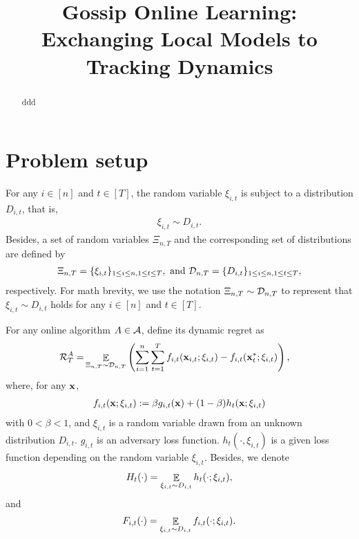 \documentclass{article}
\title{Gossip Online Learning: Exchanging Local Models to Tracking Dynamics}
\begin{document}
\maketitle

\begin{abstract}
ddd
\end{abstract}

\section{Problem setup}

For any $i\in[n]$ and $t\in[T]$, the random variable $\xi_{i,t}$ is subject to a distribution $D_{i,t}$, that is,
\begin{align}
\nonumber
\xi_{i,t} \sim D_{i,t}.
\end{align} Besides, a set of random variables $\Xi_{n,T}$ and the corresponding set of distributions are defined by
\begin{align}
\nonumber
\Xi_{n,T} = \{ \xi_{i,t} \}_{1\le i \le n, 1 \le t \le T}, \text{~and~} \mathcal{D}_{n,T} = \{ D_{i,t} \}_{1\le i \le n, 1 \le t \le T},
\end{align} respectively. For math brevity, we use the notation $\Xi_{n,T} \sim \mathcal{D}_{n,T}$ to represent that $\xi_{i,t} \sim D_{i,t}$ holds for any $i\in[n]$ and $t\in[T]$.  





For any online algorithm $A \in {\mathcal{A}}$, define its dynamic regret as
\begin{align}
\nonumber
{\mathcal{R}}_T^{A} = & \mathop{\mathbb{E}}_{ \Xi_{n,T} \sim \mathcal{D}_{n,T} } \left(  \sum_{i=1}^n\sum_{t=1}^T f_{i,t}({\bf x}_{i,t};\xi_{i,t}) - f_{i,t}({\bf x}_t^\ast;\xi_{i,t})  \right),
\end{align} where, for any ${\bf x}$,
\begin{align}
\nonumber
f_{i,t}({\bf x};\xi_{i,t}) := \beta g_{i,t}({\bf x}) + (1-\beta) h_t({\bf x}; \xi_{i,t})
\end{align} with $0<\beta<1$, and $\xi_{i,t}$ is a random variable drawn from an unknown distribution $D_{i,t}$. $g_{i,t}$ is an adversary loss function. $h_t(\cdot, \xi_{i,t})$ is a given loss function depending on the random variable $\xi_{i,t}$. Besides, we denote 
\begin{align}
\nonumber
H_t(\cdot) = \mathop{\mathbb{E}}_{\xi_{i,t} \sim D_{i,t}} h_t(\cdot; \xi_{i,t}),
\end{align} and 
\begin{align}
\nonumber
F_{i,t}(\cdot) = \mathop{\mathbb{E}}_{\xi_{i,t} \sim D_{i,t}} f_{i,t}(\cdot; \xi_{i,t}).
\end{align}
\end{document}
